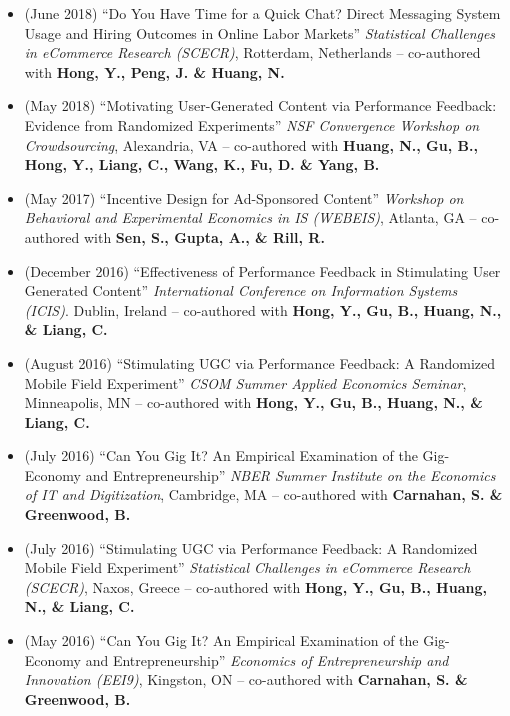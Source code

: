 \documentclass[10.5pt,letterpaper,sans]{moderncv}        %
\begin{document}
\begin{itemize}
\item (June 2018) ``Do You Have Time for a Quick Chat? Direct Messaging System Usage and Hiring Outcomes in Online Labor Markets'' \textit{Statistical Challenges in eCommerce Research (SCECR)}, Rotterdam, Netherlands -- co-authored with \textbf{Hong, Y., Peng, J. \& Huang, N.}

\item (May 2018) ``Motivating User-Generated Content via Performance Feedback: Evidence from Randomized Experiments'' \textit{NSF Convergence Workshop on Crowdsourcing}, Alexandria, VA -- co-authored with \textbf{Huang, N., Gu, B., Hong, Y., Liang, C., Wang, K., Fu, D. \& Yang, B.}

\item (May 2017) ``Incentive Design for Ad-Sponsored Content'' \textit{Workshop on Behavioral and Experimental Economics in IS (WEBEIS)}, Atlanta, GA -- co-authored with \textbf{Sen, S., Gupta, A., \& Rill, R.}

\item (December 2016) ``Effectiveness of Performance Feedback in Stimulating User Generated Content'' \textit{International Conference on Information Systems (ICIS)}. Dublin, Ireland -- co-authored with \textbf{Hong, Y., Gu, B., Huang, N., \& Liang, C.}

\item (August 2016) ``Stimulating UGC via Performance Feedback: A Randomized Mobile Field Experiment'' \textit{CSOM Summer Applied Economics Seminar}, Minneapolis, MN -- co-authored with \textbf{Hong, Y., Gu, B., Huang, N., \& Liang, C.}

\item (July 2016) ``Can You Gig It? An Empirical Examination of the Gig-Economy and Entrepreneurship'' \textit{NBER Summer Institute on the Economics of IT and Digitization}, Cambridge, MA -- co-authored with \textbf{Carnahan, S. \& Greenwood, B.}

\item (July 2016) ``Stimulating UGC via Performance Feedback: A Randomized Mobile Field Experiment'' \textit{Statistical Challenges in eCommerce Research (SCECR)}, Naxos, Greece -- co-authored with \textbf{Hong, Y., Gu, B., Huang, N., \& Liang, C.}

\item (May 2016) ``Can You Gig It? An Empirical Examination of the Gig-Economy and Entrepreneurship'' \textit{Economics of Entrepreneurship and Innovation (EEI9)}, Kingston, ON -- co-authored with \textbf{Carnahan, S. \& Greenwood, B.}


\end{itemize}
\end{document}
